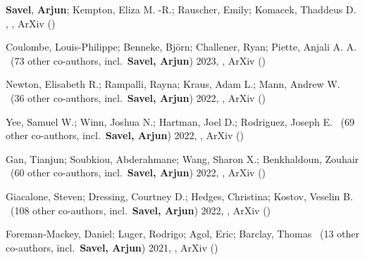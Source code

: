 \item[{\color{numcolor}\scriptsize7}] \textbf{Savel}, \textbf{Arjun}; Kempton, Eliza M. -R.; Rauscher, Emily; Komacek, Thaddeus D. , , ArXiv ()

\item[{\color{numcolor}\scriptsize6}] Coulombe, Louis-Philippe; Benneke, Bj{\"o}rn; Challener, Ryan; Piette, Anjali A. A. \etal\ ({73} other co-authors, incl.\ \textbf{Savel, Arjun}) 2023, , ArXiv ()

\item[{\color{numcolor}\scriptsize5}] Newton, Elisabeth R.; Rampalli, Rayna; Kraus, Adam L.; Mann, Andrew W. \etal\ ({36} other co-authors, incl.\ \textbf{Savel, Arjun}) 2022, , ArXiv ()

\item[{\color{numcolor}\scriptsize4}] Yee, Samuel W.; Winn, Joshua N.; Hartman, Joel D.; Rodriguez, Joseph E. \etal\ ({69} other co-authors, incl.\ \textbf{Savel, Arjun}) 2022, , ArXiv ()

\item[{\color{numcolor}\scriptsize3}] Gan, Tianjun; Soubkiou, Abderahmane; Wang, Sharon X.; Benkhaldoun, Zouhair \etal\ ({60} other co-authors, incl.\ \textbf{Savel, Arjun}) 2022, , ArXiv ()

\item[{\color{numcolor}\scriptsize2}] Giacalone, Steven; Dressing, Courtney D.; Hedges, Christina; Kostov, Veselin B. \etal\ ({108} other co-authors, incl.\ \textbf{Savel, Arjun}) 2022, , ArXiv ()

\item[{\color{numcolor}\scriptsize1}] Foreman-Mackey, Daniel; Luger, Rodrigo; Agol, Eric; Barclay, Thomas \etal\ ({13} other co-authors, incl.\ \textbf{Savel, Arjun}) 2021, , ArXiv ()
